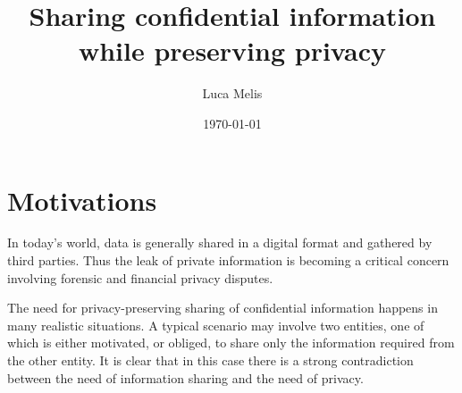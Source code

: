 \documentclass[dvips,12pt]{article}
\begin{document}
\title{Sharing confidential information while preserving privacy}
\author{Luca Melis}
\date{\today}



\maketitle
\section{Motivations}


In today's world, data is generally shared in a digital format and gathered by third parties.
Thus the leak of private information is becoming a critical concern involving forensic and financial privacy disputes.
   
The need for privacy-preserving sharing of confidential information happens in many realistic situations.
A typical scenario may involve two entities, one of which is either motivated, or obliged, to share only the information required from the other entity.
It is clear that in this case there is a strong contradiction between the need of information sharing and the need of privacy.
\end{document}
